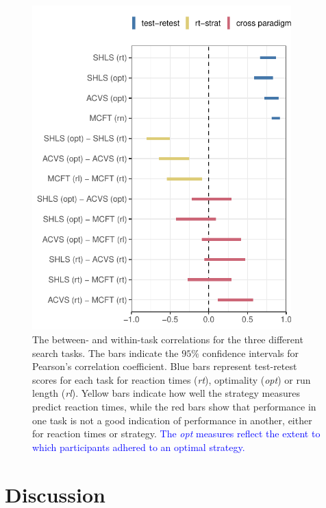\documentclass[Afour, sageapa, times]{sagej}
\begin{document}
\begin{figure}
\centering
\includegraphics[width=10cm]{../Scripts/scratch/cor_comparison.pdf}
\caption{The between- and within-task correlations for the three different search tasks. The bars indicate the $95\%$ confidence intervals for Pearson's correlation coefficient. Blue bars represent test-retest scores for each task for reaction times (\textit{rt}), optimality (\textit{opt}) or run length (\textit{rl}). Yellow bars indicate how well the strategy measures predict reaction times, while the red bars show that performance in one task is not a good indication of performance in another, either for reaction times or strategy. \textcolor{blue}{The \textit{opt} measures reflect the extent to which participants adhered to an optimal strategy.}}
\label{fig:all_the_cor}
\end{figure}


\section{Discussion}
\end{document}
